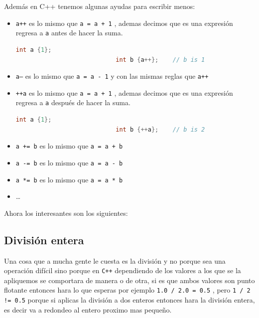 \documentclass[12pt, fleqn]{report}                             %
\theoremstyle{break}                                            %
\newcommand{\textCode}[1]  { \texttt{#1} }                      %
\newcommand{\Cpp}{\ignorespaces\textCode{C++}}                  %
\begin{document}
                Además en C++ tenemos algunas ayudas para escribir menos:
                \begin{itemize}
                    \item \textCode{a++} es lo mismo que \textCode{a = a + 1}, ademas 
                        decimos que es una expresión regresa a \textCode{a} antes de hacer la suma.
                        \begin{lstlisting}[language=C++, gobble=28]
                            int a {1};
                            int b {a++};    // b is 1
                        \end{lstlisting}
                    \item \textCode{a---} es lo mismo que \textCode{a = a - 1} y con las mismas reglas que \textCode{a++}
                    \item \textCode{++a} es lo mismo que \textCode{a = a + 1}, ademas 
                        decimos que es una expresión regresa a \textCode{a} después de hacer la suma.
                        \begin{lstlisting}[language=C++, gobble=28]
                            int a {1};
                            int b {++a};    // b is 2
                        \end{lstlisting}
                    \item \textCode{a += b} es lo mismo que \textCode{a = a + b}
                    \item \textCode{a -= b} es lo mismo que \textCode{a = a - b}
                    \item \textCode{a *= b} es lo mismo que \textCode{a = a * b}
                    \item \dots
                \end{itemize}

                Ahora los interesantes son los siguientes:

            \subsection{División entera}

                Una cosa que a mucha gente le cuesta es la división y no porque
                sea una operación difícil sino porque en \Cpp dependiendo de los
                valores a los que se la apliquemos se comportara de manera o de otra,
                si es que ambos valores son punto flotante entonces hara lo que esperas
                por ejemplo \textCode{1.0 / 2.0 = 0.5}, pero \textCode{1 / 2 != 0.5} porque
                si aplicas la división a dos enteros entonces hara la división entera, es decir
                va a redondeo al entero proximo mas pequeño.
\end{document}
